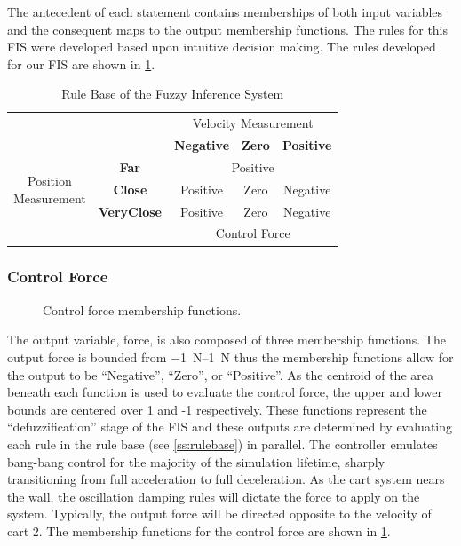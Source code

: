 The antecedent of each statement contains memberships of both input variables and the consequent maps to the
output membership functions. The rules for this FIS were developed based upon intuitive decision making. The
rules developed for our FIS are shown in \cref{tab:rulebase}.  
\begin{table}[ht]
    \begin{center}
        \caption{Rule Base of the Fuzzy Inference System}\label{tab:rulebase}
        \begin{tabular}{ccccc} \multicolumn{2}{c}{}  & \multicolumn{3}{c}{Velocity Measurement}\\ \cline{3-5}
            \multicolumn{2}{c|}{}  & \multicolumn{1}{c|}{\textbf{Negative}} & \multicolumn{1}{c|}{\textbf{Zero}} & \multicolumn{1}{c|}{\textbf{Positive}} \\ \cline{2-5}
            \multicolumn{1}{c|}{\multirow{3}{*}{\parbox{3cm}{\centering Position\\Measurement}}} & \multicolumn{1}{c|}{\textbf{Far}} & \multicolumn{3}{c|}{Positive} \\ \cline{2-5}
            \multicolumn{1}{c|}{} & \multicolumn{1}{c|}{\textbf{Close}} & \multicolumn{1}{c|}{Positive} & \multicolumn{1}{c|}{Zero} & \multicolumn{1}{c|}{Negative}\\\cline{2-5}
            \multicolumn{1}{c|}{} & \multicolumn{1}{c|}{\textbf{VeryClose}} & \multicolumn{1}{c|}{Positive} & \multicolumn{1}{c|}{Zero} & \multicolumn{1}{c|}{Negative} \\ \cline{2-5}
            \multicolumn{2}{c}{}  & \multicolumn{3}{c}{Control Force}
        \end{tabular}
    \end{center}
\end{table}

\subsubsection{Control Force}
\begin{figure}[ht]
    \centering
    
    \caption{Control force membership functions.}
    \label{f:fmfs}
\end{figure}
The output variable, force, is
also composed of three membership functions. The output force is bounded from \SIrange{-1}{1}{\newton} thus
the membership functions allow for the output to be ``Negative'', ``Zero'', or ``Positive''. As the centroid
of the area beneath each function is used to evaluate the control force, the upper and lower bounds are
centered over 1 and -1 respectively. These functions represent the ``defuzzification'' stage of the FIS and
these outputs are determined by evaluating each rule in the rule base (see \cref{ss:rulebase}) in
parallel\cite{matlab:12tb}. The controller emulates bang-bang control for the majority of the simulation
lifetime, sharply transitioning from full acceleration to full deceleration. As the cart system nears the
wall, the oscillation damping rules will dictate the force to apply on the system. Typically, the output force
will be directed opposite to the velocity of cart 2. The membership functions for the control force are shown
in \cref{f:fmfs}.
	
